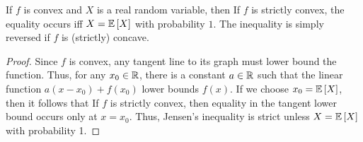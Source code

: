 \documentclass[letterpaper,10pt,english]{article}
\begin{document}
\begin{lem} 
If $f$ is convex and $X$ is a real random variable, then
If $f$ is strictly convex, the equality occurs iff $X = \mathbb{E}\left[X\right]$ with probability $1$. 
The inequality is simply reversed if $f$ is (strictly) concave.
\end{lem} 
\begin{proof} 
Since $f$ is convex, any tangent line to its graph must lower bound the function. 
Thus, for any $x_0 \in \mathbb{R}$, there is a constant $a \in \mathbb{R}$ such that the linear function $a(x - x_0) + f(x_0)$ lower bounds $f(x)$. 
If we choose $x_0 = \mathbb{E}\left[X\right]$, then it follows that
If $f$ is strictly convex, then equality in the tangent lower bound occurs only at $x = x_0$. 
Thus, Jensen's inequality is strict unless $X = \mathbb{E}\left[X\right]$ with probability 1.
\end{proof}
\end{document}
